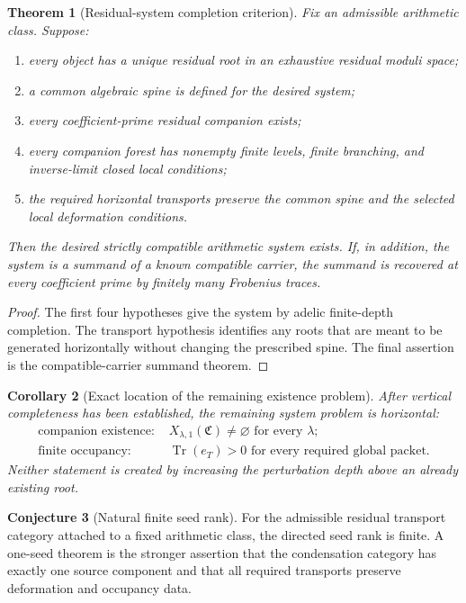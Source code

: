 \documentclass[11pt]{article}
\newtheorem{theorem}{Theorem}[section]
\newtheorem{corollary}[theorem]{Corollary}
\theoremstyle{definition}
\newtheorem{conjecture}[theorem]{Conjecture}
\theoremstyle{remark}
\newcommand{\Tr}{\operatorname{Tr}}
\newcommand{\Compat}{\mathfrak C}
\begin{document}
\begin{theorem}[Residual-system completion criterion]
Fix an admissible arithmetic class.  Suppose:
\begin{enumerate}
\item every object has a unique residual root in an exhaustive residual moduli space;
\item a common algebraic spine is defined for the desired system;
\item every coefficient-prime residual companion exists;
\item every companion forest has nonempty finite levels, finite branching, and inverse-limit closed local conditions;
\item the required horizontal transports preserve the common spine and the selected local deformation conditions.
\end{enumerate}
Then the desired strictly compatible arithmetic system exists.  If, in addition, the system is a summand of a known compatible carrier, the summand is recovered at every coefficient prime by finitely many Frobenius traces.
\end{theorem}

\begin{proof}
The first four hypotheses give the system by adelic finite-depth completion.  The transport hypothesis identifies any roots that are meant to be generated horizontally without changing the prescribed spine.  The final assertion is the compatible-carrier summand theorem.
\end{proof}

\begin{corollary}[Exact location of the remaining existence problem]
After vertical completeness has been established, the remaining system problem is horizontal:
\[
\boxed{
\begin{aligned}
\text{companion existence: }&X_{\lambda,1}(\Compat)\ne\varnothing
\text{ for every }\lambda;\\
\text{finite occupancy: }&\Tr(e_T)>0
\text{ for every required global packet.}
\end{aligned}}
\]
Neither statement is created by increasing the perturbation depth above an already existing root.
\end{corollary}

\begin{conjecture}[Natural finite seed rank]
For the admissible residual transport category attached to a fixed arithmetic class, the directed seed rank is finite.  A one-seed theorem is the stronger assertion that the condensation category has exactly one source component and that all required transports preserve deformation and occupancy data.
\end{conjecture}
\end{document}
